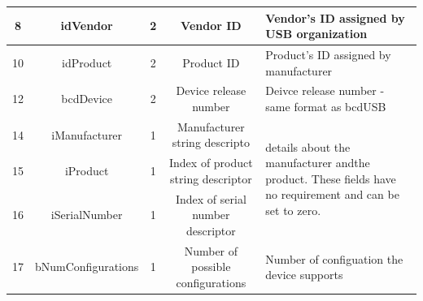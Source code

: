 \documentclass{article}
\begin{document}
\begin{table}[H]
\begin{adjustbox}{max width=\textwidth}
\begin{tabular}{|c|c|c|c|p{6cm}|}
            \hline
            8                          & idVendor           & 2                        & Vendor ID                          & Vendor's ID assigned by USB organization                                                                                                     \\
            \hline
            10                         & idProduct          & 2                        & Product ID                         & Product's ID assigned by manufacturer                                                                                                        \\
            \hline
            12                         & bcdDevice          & 2                        & Device release number              & Deivce release number - same format as bcdUSB                                                                                                \\
            \hline
            14                         & iManufacturer      & 1                        & Manufacturer string descripto      & \multirow{3}{6cm}{details about the manufacturer andthe product. These fields have no requirement and can be set to zero.}                   \\
            \cline{1-4}
            15                         & iProduct           & 1                        & Index of product string descriptor &                                                                                                                                              \\
            \cline{1-4}
            16                         & iSerialNumber      & 1                        & Index of serial number descriptor  &                                                                                                                                              \\
            \hline
            17                         & bNumConfigurations & 1                        & Number of possible configurations  & Number of configuation the device supports                                                                                                   \\
            \hline
        \end{tabular}
    \end{adjustbox}
\end{table}
\end{document}
